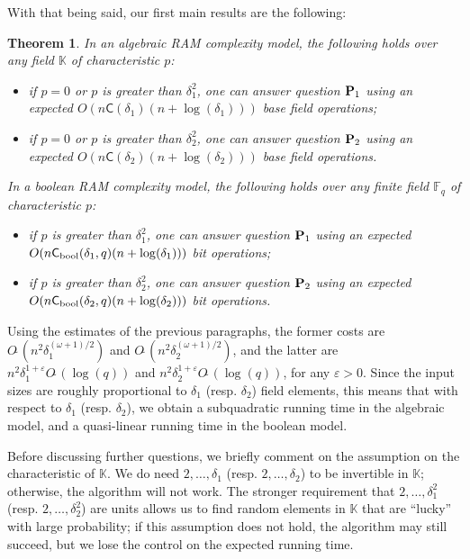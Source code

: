 \documentclass[12pt]{article}
\def\CC {\ensuremath{\mathsf{C}}}
\def\F {\ensuremath{\mathbb{F}}}
\def\K {\ensuremath{\mathbb{K}}}
\def\Ot {O\tilde{~}}
\newtheorem{Theo}{Theorem}
\begin{document}
With that being said, our first main results are the following:
\begin{Theo}
  \label{theo:CtoE}
  In an algebraic RAM complexity model, the following holds over any
  field $\K$ of characteristic $p$:
  \begin{itemize}
  \item if $p=0$ or $p$ is greater than $\delta_1^2$, one can answer
    question ${\bf P}_1$ using an expected
    $O(n\CC(\delta_1)(n+\log(\delta_1)))$ base field
    operations;
  \item if $p=0$ or $p$ is greater than $\delta_2^2$, one can answer
    question ${\bf P}_2$ using an expected
    $O(n\CC(\delta_2)(n+\log(\delta_2)))$ base field operations.
  \end{itemize}
  In a boolean RAM complexity model, the following holds over any
  finite field $\F_q$ of characteristic $p$:
  \begin{itemize}
  \item if $p$ is greater than $\delta_1^2$, one can answer question
    ${\bf P}_1$ using an expected $O(n\CC_{\rm
      bool}(\delta_1,q)(n+\log(\delta_1)))$ bit operations;
  \item if $p$ is greater than $\delta_2^2$, one can answer question
    ${\bf P}_2$ using an expected $O(n\CC_{\rm
      bool}(\delta_2,q)(n+\log(\delta_2)))$ bit operations.
  \end{itemize}
\end{Theo}
Using the estimates of the previous paragraphs, the former costs are
$O\tilde{~}(n^2 \delta_1^{(\omega+1)/2})$ and $O\tilde{~}(n^2
\delta_2^{(\omega+1)/2})$, and the latter are
$n^2\delta_1^{1+\varepsilon}\Ot(\log(q))$ and $n^2
\delta_2^{1+\varepsilon}\Ot(\log(q))$, for any $\varepsilon>0$.  Since
the input sizes are roughly proportional to $\delta_1$
(resp. $\delta_2$) field elements, this means that with respect to
$\delta_1$ (resp. $\delta_2$), we obtain a subquadratic running time
in the algebraic model, and a quasi-linear running time in the boolean
model.

Before discussing further questions, we briefly comment on the
assumption on the characteristic of $\K$. We do need $2,\dots,\delta_1$
(resp. $2,\dots,\delta_2$) to be invertible in $\K$; otherwise, the
algorithm will not work. The stronger requirement that
$2,\dots,\delta_1^2$ (resp. $2,\dots,\delta_2^2$) are units allows us
to find random elements in $\K$ that are ``lucky'' with large
probability; if this assumption does not hold, the algorithm may still
succeed, but we lose the control on the expected running time.
\end{document}
